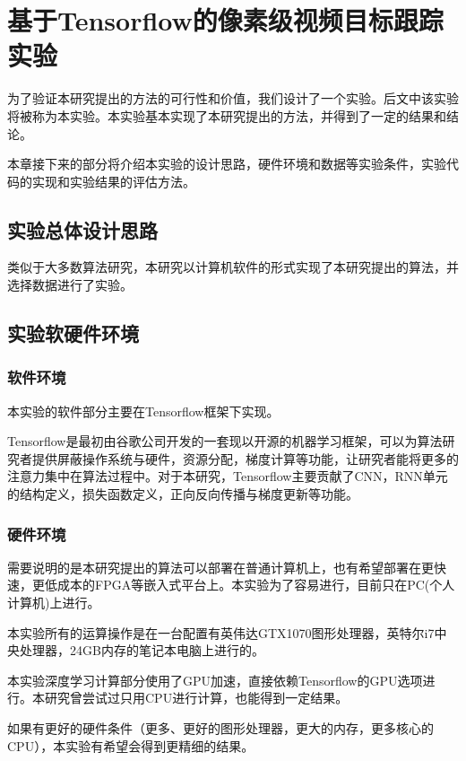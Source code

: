 
\chapter{基于Tensorflow的像素级视频目标跟踪实验} \label{section:experiment}
为了验证本研究提出的方法的可行性和价值，我们设计了一个实验。后文中该实验将被称为本实验。本实验基本实现了本研究提出的方法，并得到了一定的结果和结论。
\par
本章接下来的部分将介绍本实验的设计思路，硬件环境和数据等实验条件，实验代码的实现和实验结果的评估方法。

\section{实验总体设计思路}
类似于大多数算法研究，本研究以计算机软件的形式实现了本研究提出的算法，并选择数据进行了实验。

\section{实验软硬件环境}
\subsection{软件环境}
本实验的软件部分主要在Tensorflow\supercite{abadi2016tensorflow}框架下实现。
\par
Tensorflow是最初由谷歌公司开发的一套现以开源的机器学习框架，可以为算法研究者提供屏蔽操作系统与硬件，资源分配，梯度计算等功能，让研究者能将更多的注意力集中在算法过程中。对于本研究，Tensorflow主要贡献了CNN，RNN单元的结构定义，损失函数定义，正向反向传播与梯度更新等功能。

\subsection{硬件环境}
\par
需要说明的是本研究提出的算法可以部署在普通计算机上，也有希望部署在更快速，更低成本的FPGA等嵌入式平台上。本实验为了容易进行，目前只在PC(个人计算机)上进行。
\par
本实验所有的运算操作是在一台配置有英伟达GTX1070图形处理器，英特尔i7中央处理器，24GB内存的笔记本电脑上进行的。
\par
本实验深度学习计算部分使用了GPU加速，直接依赖Tensorflow的GPU选项进行。本研究曾尝试过只用CPU进行计算，也能得到一定结果。
\par
如果有更好的硬件条件（更多、更好的图形处理器，更大的内存，更多核心的CPU），本实验有希望会得到更精细的结果。

